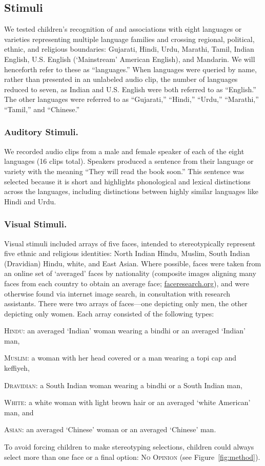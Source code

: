 \documentclass{foushee-adapted-preprint}
\begin{document}
\subsection{Stimuli}
We tested children's recognition of and associations with eight languages or varieties representing multiple language families and crossing regional, political, ethnic, and religious boundaries: Gujarati, Hindi, Urdu, Marathi, Tamil, Indian English, U.S. English (`Mainstream' American English), and Mandarin. 
We will henceforth refer to these as ``languages.'' 
When languages were queried by name, rather than presented in an unlabeled audio clip, the number of languages reduced to seven, as Indian and U.S. English were both referred to as ``English.'' 
The other languages were referred to as ``Gujarati,'' ``Hindi,'' ``Urdu,'' ``Marathi,'' ``Tamil,'' and ``Chinese.'' 

\subsubsection{Auditory Stimuli.}
We recorded audio clips from a male and female speaker of each of the eight languages (16 clips total). 
Speakers produced a sentence from their language or variety with the meaning ``They will read the book soon.'' 
This sentence was selected because it is short and highlights phonological and lexical distinctions across the languages, including distinctions between highly similar languages like Hindi and Urdu. 

\subsubsection{Visual Stimuli.}
Visual stimuli included arrays of five faces, intended to stereotypically represent five ethnic and religious identities: North Indian Hindu, Muslim, South Indian (Dravidian) Hindu, white, and East Asian. 
Where possible, faces were taken from an online set of `averaged' faces by nationality (composite images aligning many faces from each country to obtain an average face; \url{faceresearch.org}), and were otherwise found via internet image search, in consultation with research assistants. 
There were two arrays of faces---one depicting only men, the other depicting only women. Each array consisted of the following types: 
\begin{inparaenum}[(1)]
    \item \textsc{Hindu}: an averaged `Indian' woman wearing a bindhi or an averaged `Indian' man,
    \item \textsc{Muslim}: a woman with her head covered or a man wearing a topi cap and keffiyeh,
    \item \textsc{Dravidian}: a South Indian woman wearing a bindhi or a South Indian man,
    \item \textsc{White}: a white woman with light brown hair or an averaged `white American' man, and
    \item \textsc{Asian}:  an averaged `Chinese' woman or an averaged `Chinese' man. 
\end{inparaenum}
To avoid forcing children to make stereotyping selections, children could always select more than one face or a final option: \textsc{No Opinion} (see Figure~\ref{fig:method}).
\end{document}
